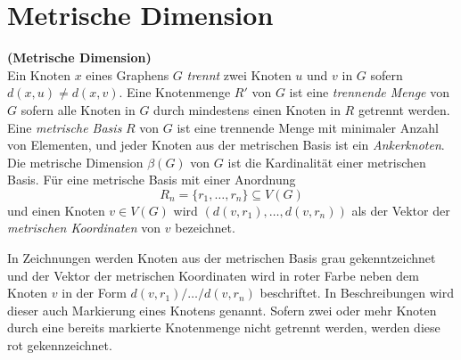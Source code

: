 \section{Metrische Dimension}
\label{MDT}
\begin{defi}{\textbf{(Metrische Dimension)}}\\
Ein Knoten $x$ eines Graphens $G$ \emph{trennt} zwei Knoten $u$ und $v$ in $G$ sofern $d(x, u) \neq d(x, v)$. Eine Knotenmenge $R'$ von $G$ ist eine \emph{trennende Menge} von $G$ sofern alle Knoten in $G$ durch mindestens einen Knoten in $R$ getrennt werden. Eine \emph{metrische Basis} $R$ von $G$ ist eine trennende Menge mit minimaler Anzahl von Elementen, und jeder Knoten aus der metrischen Basis ist ein \emph{Ankerknoten}. %
Die metrische Dimension $\beta(G)$ von $G$ ist die Kardinalität einer metrischen Basis. Für eine metrische Basis mit einer Anordnung $$R_n = \{r_1 , \ldots , r_n \} \subseteq V (G)$$ und einen Knoten $v \in V (G)$ wird $(d(v, r_1 ), \ldots , d(v, r_n ))$ als der Vektor der \emph{metrischen Koordinaten} von $v$ bezeichnet.
\end{defi}
\begin{bsp}
\end{bsp}
\begin{bem}
In Zeichnungen werden Knoten aus der metrischen Basis grau gekenntzeichnet und der Vektor der metrischen Koordinaten wird in roter Farbe neben dem Knoten $v$ in der Form $d(v, r_1 )/ \ldots / d(v, r_n )$ beschriftet. In Beschreibungen wird dieser auch Markierung eines Knotens genannt. Sofern zwei oder mehr Knoten durch eine bereits markierte Knotenmenge nicht getrennt werden, werden diese rot gekennzeichnet. 
\end{bem}
